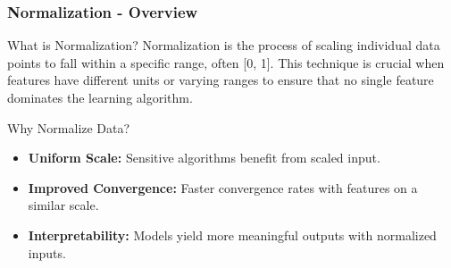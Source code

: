 \documentclass[aspectratio=169]{beamer}
\begin{document}
\begin{frame}[fragile]
    \frametitle{Normalization - Overview}
    \begin{block}{What is Normalization?}
        Normalization is the process of scaling individual data points to fall within a specific range, often [0, 1]. 
        This technique is crucial when features have different units or varying ranges to ensure that no single feature dominates the learning algorithm.
    \end{block}

    \begin{block}{Why Normalize Data?}
        \begin{itemize}
            \item \textbf{Uniform Scale:} Sensitive algorithms benefit from scaled input.
            \item \textbf{Improved Convergence:} Faster convergence rates with features on a similar scale.
            \item \textbf{Interpretability:} Models yield more meaningful outputs with normalized inputs.
        \end{itemize}
    \end{block}
\end{frame}
\end{document}
